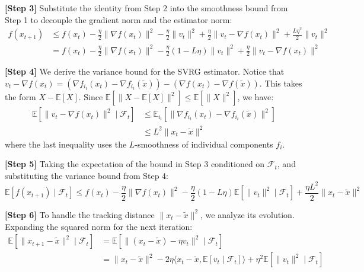 \documentclass[11pt]{article}
\begin{document}
\textbf{[Step 3]} Substitute the identity from Step 2 into the smoothness bound from Step 1 to decouple the gradient norm and the estimator norm:
\begin{align} 
    f(x_{t+1}) &\le f(x_t) - \frac{\eta}{2} \|\nabla f(x_t)\|^2 - \frac{\eta}{2} \|v_t\|^2 + \frac{\eta}{2} \|v_t - \nabla f(x_t)\|^2 + \frac{L\eta^2}{2} \|v_t\|^2 \nonumber \\
    &= f(x_t) - \frac{\eta}{2} \|\nabla f(x_t)\|^2 - \frac{\eta}{2}(1 - L\eta) \|v_t\|^2 + \frac{\eta}{2} \|v_t - \nabla f(x_t)\|^2 \tag{Step 3}
\end{align}

\textbf{[Step 4]} We derive the variance bound for the SVRG estimator. Notice that $v_t - \nabla f(x_t) = (\nabla f_{i_t}(x_t) - \nabla f_{i_t}(\tilde{x})) - (\nabla f(x_t) - \nabla f(\tilde{x}))$. This takes the form $X - \mathbb{E}[X]$. Since $\mathbb{E}[\|X - \mathbb{E}[X]\|^2] \le \mathbb{E}[\|X\|^2]$, we have:
\begin{align} 
    \mathbb{E}[\|v_t - \nabla f(x_t)\|^2 \mid \mathcal{F}_t] &\le \mathbb{E}_{i_t}[\|\nabla f_{i_t}(x_t) - \nabla f_{i_t}(\tilde{x})\|^2] \nonumber \\
    &\le L^2 \|x_t - \tilde{x}\|^2 \tag{Step 4}
\end{align}
where the last inequality uses the $L$-smoothness of individual components $f_i$.

\textbf{[Step 5]} Taking the expectation of the bound in Step 3 conditioned on $\mathcal{F}_t$, and substituting the variance bound from Step 4:
\begin{equation} \tag{Step 5}
    \mathbb{E}[f(x_{t+1}) \mid \mathcal{F}_t] \le f(x_t) - \frac{\eta}{2} \|\nabla f(x_t)\|^2 - \frac{\eta}{2}(1 - L\eta) \mathbb{E}[\|v_t\|^2 \mid \mathcal{F}_t] + \frac{\eta L^2}{2} \|x_t - \tilde{x}\|^2
\end{equation}

\textbf{[Step 6]} To handle the tracking distance $\|x_t - \tilde{x}\|^2$, we analyze its evolution. Expanding the squared norm for the next iteration:
\begin{align} 
    \mathbb{E}[\|x_{t+1} - \tilde{x}\|^2 \mid \mathcal{F}_t] &= \mathbb{E}[\|(x_t - \tilde{x}) - \eta v_t\|^2 \mid \mathcal{F}_t] \nonumber \\
    &= \|x_t - \tilde{x}\|^2 - 2\eta \langle x_t - \tilde{x}, \mathbb{E}[v_t \mid \mathcal{F}_t] \rangle + \eta^2 \mathbb{E}[\|v_t\|^2 \mid \mathcal{F}_t] \tag{Step 6}
\end{align}
\end{document}
